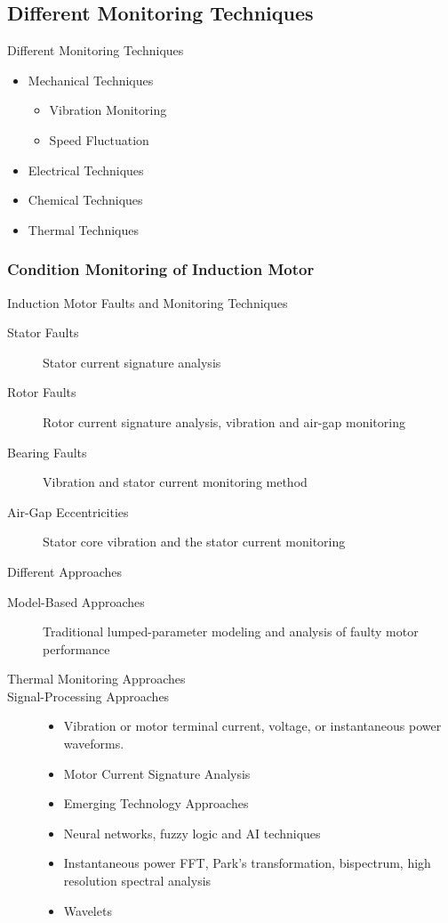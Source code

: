 \documentclass[10pt]{beamer}
\begin{document}
\begin{frame}
\subsection{Different Monitoring Techniques}
\begin{block}{Different Monitoring Techniques}
\begin{itemize}
	\item Mechanical Techniques
	\begin{itemize}
		\item Vibration Monitoring
		\item Speed Fluctuation
	\end{itemize}
	\item Electrical Techniques
	\item Chemical Techniques
	\item Thermal Techniques
\end{itemize}
\end{block}
\end{frame}

\begin{frame}
\frametitle{Condition Monitoring of Induction Motor}
\begin{block}{Induction Motor Faults and Monitoring Techniques}
\begin{description}
          \item[Stator Faults] Stator current signature analysis
	  \item[Rotor Faults] Rotor current signature analysis, vibration and air-gap monitoring
          \item[Bearing Faults] Vibration and stator current monitoring method
          \item[Air-Gap  Eccentricities] Stator core vibration and the stator current monitoring
\end{description}
\end{block}

\begin{block}{Different Approaches}
\begin{description}
	\item[Model-Based Approaches] Traditional lumped-parameter modeling and analysis of faulty motor performance
	\item[Thermal Monitoring Approaches]
        \item[Signal-Processing Approaches]
	\begin{itemize}
		\item Vibration or motor terminal current, voltage, or instantaneous power waveforms.
		\item Motor  Current  Signature  Analysis
	       	\item Emerging Technology Approaches
 		\item Neural networks, fuzzy logic and AI techniques
		\item Instantaneous power FFT, Park’s transformation, bispectrum, high resolution spectral analysis
		\item Wavelets
	\end{itemize}
\end{description}
\end{block}
\end{frame}
\end{document}
